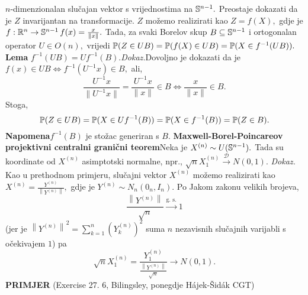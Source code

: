 \documentclass{article}
\begin{document}
\(n\)-dimenzionalan slučajan vektor s vrijednostima na \(\Bbb S^{n-1}.\) Preostaje dokazati da je \(Z\) invarijantan na transformacije. \(Z\) možemo  realizirati kao \(Z=f(X),\) gdje je \(f:\Bbb R^n\to\Bbb S^{n-1}\,f(x)=\frac{x}{\|x\|}.\) Tada, za svaki Borelov skup \(B\subseteq\Bbb S^{n-1}\) i ortogonalan operator \(U\in O(n), \) vrijedi \(\Bbb P(Z\in UB)=\Bbb P(f(X)\in UB)=\Bbb P(X\in f^{-1}(UB)).\)\newline\textbf{Lema} \(f^{-1}(UB)=Uf^{-1}(B).\)\newline\textit{Dokaz.}\newline Dovoljno je dokazati da je \(f(x)\in UB\Leftrightarrow f^{-1}(U^{-1}x)\in B,\) ali, \[\frac{U^{-1}x}{\|U^{-1}x\|}=\frac{U^{-1}x}{\|x\|}\in B\Leftrightarrow\frac{x}{\|x\|}\in B.\] Stoga, \[\Bbb P(Z\in UB)=\Bbb P(X\in Uf^{-1}(B))=\Bbb P(X\in f^{-1}(B))=\Bbb P(Z\in B).\]\textbf{Napomena}\newline \(f^{-1}(B)\) je stožac generiran s \(B.\)\newline\newline
\textbf{Maxwell-Borel-Poincareov projektivni centralni granični teorem}\newline Neka je \(X^{(n)}\sim U(\Bbb S^{n-1}).\) Tada su koordinate od \(X^{(n)}\) asimptotski normalne, npr., \(\sqrt nX_1^{(n)}\overset{\mathcal D}{\longrightarrow}N(0,1).\)\newline\newline
\textit{Dokaz.}\newline
Kao u prethodnom primjeru, slučajni vektor \(X^{(n)}\) možemo realizirati kao \(X^{(n)}=\frac{Y^{(n)}}{\left\|Y^{(n)}\right\|},\) gdje je \(Y^{(n)}\sim N_n(0_n,I_n).\) Po Jakom zakonu velikih brojeva, \[\frac{\left\|Y^{(n)}\right\|}{\sqrt n}\overset{\text{g. s.}}{\longrightarrow}1\] (jer je \(\left\|Y^{(n)}\right\|^2=\sum_{k=1}^n\left(Y^{(n)}_k\right)^2\) suma \(n\) nezavisnih slučajnih varijabli s očekivajem \(1\)) pa \[\sqrt nX_1^{(n)}=\frac{Y^{(n)}_1}{\frac{\left\|Y^{(n)}\right\|}{\sqrt n}}\to N(0,1).\]
\textbf{PRIMJER} (Exercise 27. 6, Bilingsley, ponegdje H\'ajek-Šid\'ak CGT)\newline
\end{document}
